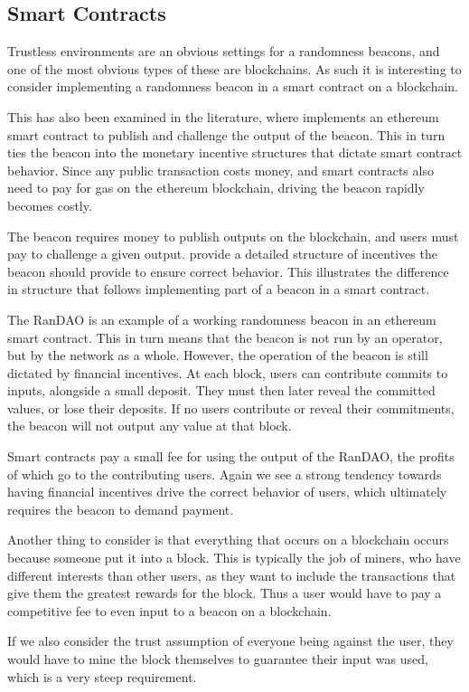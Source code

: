 \subsection{Smart Contracts}
Trustless environments are an obvious settings for a randomness beacons, and one of the most obvious types of these are blockchains. As such it is interesting to consider implementing a randomness beacon in a smart contract on a blockchain.

This has also been examined in the literature, where \citet{proofofdelay} implements an ethereum smart contract to publish and challenge the output of the beacon. This in turn ties the beacon into the monetary incentive structures that dictate smart contract behavior. Since any public transaction costs money, and smart contracts also need to pay for gas on the ethereum blockchain, driving the beacon rapidly becomes costly.

The beacon requires money to publish outputs on the blockchain, and users must pay to challenge a given output. \citet{proofofdelay} provide a detailed structure of incentives the beacon should provide to ensure correct behavior. This illustrates the difference in structure that follows implementing part of a beacon in a smart contract.

The RanDAO\cite{randao} is an example of a working randomness beacon in an ethereum smart contract. This in turn means that the beacon is not run by an operator, but by the network as a whole. However, the operation of the beacon is still dictated by financial incentives. At each block, users can contribute commits to inputs, alongside a small deposit. They must then later reveal the committed values, or lose their deposits. If no users contribute or reveal their commitments, the beacon will not output any value at that block.

Smart contracts pay a small fee for using the output of the RanDAO, the profits of which go to the contributing users. Again we see a strong tendency towards having financial incentives drive the correct behavior of users, which ultimately requires the beacon to demand payment.

Another thing to consider is that everything that occurs on a blockchain occurs because someone put it into a block. This is typically the job of miners, who have different interests than other users, as they want to include the transactions that give them the greatest rewards for the block. Thus a user would have to pay a competitive fee to even input to a beacon on a blockchain.

If we also consider the trust assumption of everyone being against the user, they would have to mine the block themselves to guarantee their input was used, which is a very steep requirement.
